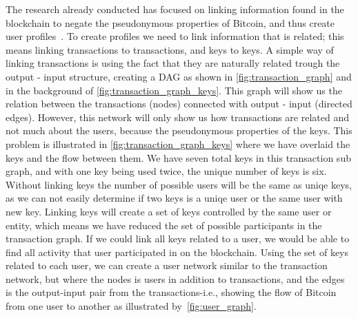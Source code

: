 The research already conducted has focused on linking information found in the blockchain to negate the pseudonymous properties of Bitcoin, and thus create user profiles~\cite{meiklejohn2013fistful,androulaki2013evaluating,reid2013analysis,ron2013quantitative}. To create profiles we need to link information that is related; this means linking transactions to transactions, and keys to keys. A simple way of linking transactions is using the fact that they are naturally related trough the output - input structure, creating a DAG as shown in \cref{fig:transaction_graph} and in the background of \cref{fig:transaction_graph_keys}. This graph will show us the relation between the transactions (nodes) connected with output - input (directed edges). However, this network will only show us how transactions are related and not much about the users, because the pseudonymous properties of the keys. This problem is illustrated in \cref{fig:transaction_graph_keys} where we have overlaid the keys and the flow between them. We have seven total keys in this transaction sub graph, and with one key being used twice, the unique number of keys is six. Without linking keys the number of possible users will be the same as uniqe keys, as we can not easily determine if two keys is a uniqe user or the same user with  new key. Linking keys will create a set of keys controlled by the same user or entity, which means we have reduced the set of possible participants in the transaction graph. If we could link all keys related to a user, we would be able to find all activity that user participated in on the blockchain. Using the set of keys related to each user, we can create a user network similar to the transaction network, but where the nodes is users in addition to transactions, and the edges is the output-input pair from the transactions-i.e., showing the flow of Bitcoin from one user to another as illustrated by~\cref{fig:user_graph}. 
